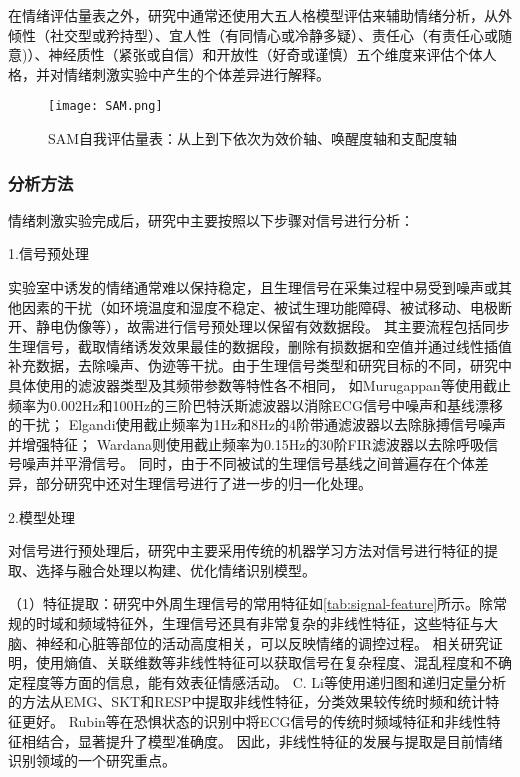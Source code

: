 在情绪评估量表之外，研究中通常还使用大五人格模型评估来辅助情绪分析\cite{AMIGOS2017}，从外倾性（社交型或矜持型）、宜人性（有同情心或冷静多疑）、责任心（有责任心或随意)）、神经质性（紧张或自信）和开放性（好奇或谨慎）五个维度来评估个体人格，并对情绪刺激实验中产生的个体差异进行解释。
\begin{figure}[htbp]
    \centering
    \texttt{[image: SAM.png]}
    \caption[SAM自我评估量表]{SAM自我评估量表：从上到下依次为效价轴、唤醒度轴和支配度轴}{\label{fig:SAM}}
\end{figure}

\subsubsection{分析方法}

情绪刺激实验完成后，研究中主要按照以下步骤对信号进行分析：

1.信号预处理

实验室中诱发的情绪通常难以保持稳定，且生理信号在采集过程中易受到噪声或其他因素的干扰（如环境温度和湿度不稳定、被试生理功能障碍、被试移动、电极断开、静电伪像等），故需进行信号预处理以保留有效数据段。
其主要流程包括同步生理信号，截取情绪诱发效果最佳的数据段，删除有损数据和空值并通过线性插值补充数据，去除噪声、伪迹等干扰。由于生理信号类型和研究目标的不同，研究中具体使用的滤波器类型及其频带参数等特性各不相同，
如Murugappan等\cite{Murugappan2013}使用截止频率为0.002Hz和100Hz的三阶巴特沃斯滤波器以消除ECG信号中噪声和基线漂移的干扰；
Elgandi\cite{Elgendi2012}使用截止频率为1Hz和8Hz的4阶带通滤波器以去除脉搏信号噪声并增强特征；
Wardana\cite{Wardana2017}则使用截止频率为0.15Hz的30阶FIR滤波器以去除呼吸信号噪声并平滑信号。
同时，由于不同被试的生理信号基线之间普遍存在个体差异，部分研究中还对生理信号进行了进一步的归一化处理\cite{Mandryk2007}。

2.模型处理

对信号进行预处理后，研究中主要采用传统的机器学习方法对信号进行特征的提取、选择与融合处理以构建、优化情绪识别模型。


（1）特征提取：研究中外周生理信号的常用特征如\autoref{tab:signal-feature}所示。除常规的时域和频域特征外，生理信号还具有非常复杂的非线性特征，这些特征与大脑、神经和心脏等部位的活动高度相关，可以反映情绪的调控过程。
相关研究证明\cite{Valenza2012,Khaliliardali2015}，使用熵值、关联维数等非线性特征可以获取信号在复杂程度、混乱程度和不确定程度等方面的信息，能有效表征情感活动。
C. Li等\cite{LiCailong2018}使用递归图和递归定量分析的方法从EMG、SKT和RESP中提取非线性特征，分类效果较传统时频和统计特征更好。
Rubin等\cite{Rubin2016}在恐惧状态的识别中将ECG信号的传统时频域特征和非线性特征相结合，显著提升了模型准确度。
因此，非线性特征的发展与提取是目前情绪识别领域的一个研究重点。

